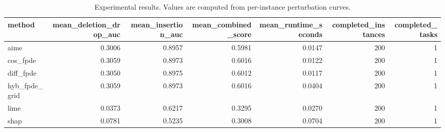 \begin{table}[t]
\caption{Experimental results. Values are computed from per-instance perturbation curves.}
\label{tab:main_results_computed}
\centering
\begin{tabular}{lrrrrrr}
\toprule
method & mean\_deletion\_drop\_auc & mean\_insertion\_auc & mean\_combined\_score & mean\_runtime\_seconds & completed\_instances & completed\_tasks \\
\midrule
aime & 0.3006 & 0.8957 & 0.5981 & 0.0147 & 200 & 1 \\
cos\_fpde & 0.3059 & 0.8973 & 0.6016 & 0.0122 & 200 & 1 \\
diff\_fpde & 0.3050 & 0.8975 & 0.6012 & 0.0117 & 200 & 1 \\
hyb\_fpde\_grid & 0.3059 & 0.8973 & 0.6016 & 0.0404 & 200 & 1 \\
lime & 0.0373 & 0.6217 & 0.3295 & 0.0270 & 200 & 1 \\
shap & 0.0781 & 0.5235 & 0.3008 & 0.0704 & 200 & 1 \\
\bottomrule
\end{tabular}

\end{table}
